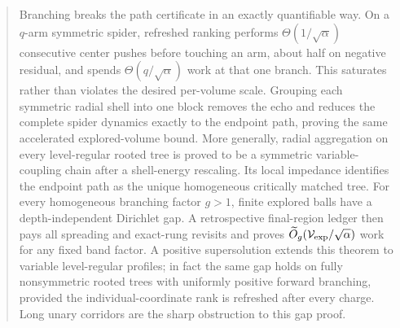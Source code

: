 \documentclass[11pt]{article}
\begin{document}
\begin{abstract}
Branching breaks the path certificate in an exactly quantifiable way. On a
$q$-arm symmetric spider, refreshed ranking performs
$\Theta(1/\sqrt\alpha)$ consecutive center pushes before touching an arm,
about half on negative residual, and spends $\Theta(q/\sqrt\alpha)$ work at
that one branch. This saturates rather than violates the desired per-volume
scale. Grouping each symmetric radial shell into one block removes the echo
and reduces the complete spider dynamics exactly to the endpoint path,
proving the same accelerated explored-volume bound. More generally, radial
aggregation on every level-regular rooted tree is proved to be a symmetric
variable-coupling chain after a shell-energy rescaling. Its local impedance
identifies the endpoint path as the unique homogeneous critically matched
tree.  For every homogeneous branching factor $g>1$, finite explored balls
have a depth-independent Dirichlet gap.  A retrospective final-region ledger
then pays all spreading and exact-rung revisits and proves
$\widetilde O_g(\mathcal V_{\rm exp}/\sqrt\alpha)$ work for any fixed band
factor.  A positive supersolution extends this theorem to variable
level-regular profiles; in fact the same gap holds on fully nonsymmetric
rooted trees with uniformly positive forward branching, provided the
individual-coordinate rank is refreshed after every charge.  Long unary
corridors are the sharp obstruction to this gap proof.


\end{abstract}
\end{document}
